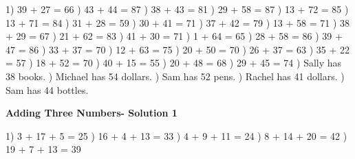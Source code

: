 \documentclass{article}%
\begin{document}
1) 39 + 27 = 66%
) 43 + 44 = 87%
) 38 + 43 = 81%
) 29 + 58 = 87%
) 13 + 72 = 85%
) 13 + 71 = 84%
) 31 + 28 = 59%
) 30 + 41 = 71%
) 37 + 42 = 79%
) 13 + 58 = 71%
) 38 + 29 = 67%
) 21 + 62 = 83%
) 41 + 30 = 71%
) 1 + 64 = 65%
) 28 + 58 = 86%
) 39 + 47 = 86%
) 33 + 37 = 70%
) 12 + 63 = 75%
) 20 + 50 = 70%
) 26 + 37 = 63%
) 35 + 22 = 57%
) 18 + 52 = 70%
) 40 + 15 = 55%
) 20 + 48 = 68%
) 29 + 45 = 74%
) Sally has 38 books.%
) Michael has 54 dollars.%
) Sam has 52 pens.%
) Rachel has 41 dollars.%
) Sam has 44 bottles.%
\newline%
\newpage%
\large%
\begin{center}%
\textbf{Adding Three Numbers- Solution 1}%
\newline%
\end{center} \normalsize%
1) 3 + 17 + 5 = 25%
) 16 + 4 + 13 = 33%
) 4 + 9 + 11 = 24%
) 8 + 14 + 20 = 42%
) 19 + 7 + 13 = 39%
\end{document}

